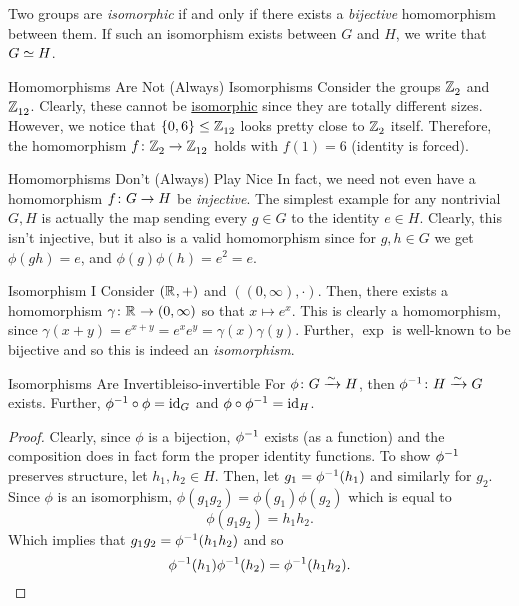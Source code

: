 \documentclass{article}
\begin{document}
Two groups are \emph{isomorphic} if and only if there
exists a \emph{bijective} homomorphism between them.
If such an isomorphism exists between $G$ and $H$, we write that $G \iso H$.

\begin{example}{Homomorphisms Are Not (Always) Isomorphisms}{}
  Consider the groups $\ZZ_{2}$ and $\ZZ_{12}$.
  Clearly, these cannot be \underline{isomorphic} since they are totally different sizes.
  However, we notice that $\set{0, 6} \le \ZZ_{12}$ looks pretty close to $\ZZ_{2}$ itself.
  Therefore, the homomorphism $f \from \ZZ_{2} \to \ZZ_{12}$ holds with $f(1) = 6$
  (identity is forced).
\end{example}

\begin{example}{Homomorphisms Don't (Always) Play Nice}{}
  In fact, we need not even have a homomorphism $f \from G \to H$ be \emph{injective}.
  The simplest example for any nontrivial $G, H$ is actually the map sending every $g \in G$
  to the identity $e \in H$. Clearly, this isn't injective, but it also is a valid homomorphism
  since for $g, h \in G$ we get $\phi(gh) = e$, and $\phi(g)\phi(h) = e^{2} = e$.
\end{example}


\begin{example}{Isomorphism I}{}
  Consider $(\RR, +)$ and $((0, \infty), \cdot)$.
  Then, there exists a homomorphism $\gamma \from \RR \to (0, \infty)$ so that $x \mapsto e^{x}$.
  This is clearly a homomorphism, since $\gamma(x + y) = e^{x + y} = e^{x}e^{y} = \gamma(x)\gamma(y)$.
  Further, $\exp$ is well-known to be bijective and so this is indeed an \emph{isomorphism}.
\end{example}

\begin{theorem}{Isomorphisms Are Invertible}{iso-invertible}
  For $\phi \from G \isoto H$, then $\phi\inv \from H \isoto G$ exists.
  Further, $\phi\inv \circ \phi = \id[G]$ and $\phi \circ \phi\inv = \id[H]$.
\end{theorem}

\begin{proof}
  Clearly, since $\phi$ is a bijection, $\phi\inv$ exists (as a function) and the composition
  does in fact form the proper identity functions.
  To show $\phi\inv$ preserves structure, let $h_{1},h_{2} \in H$.
  Then, let $g_{1} = \phi\inv(h_{1})$ and similarly for $g_{2}$.
  Since $\phi$ is an isomorphism, $\phi(g_{1}g_{2}) = \phi(g_{1})\phi(g_{2})$ which is equal to
  \[ \phi(g_{1}g_{2}) = h_{1}h_{2}. \]
  Which implies that $g_{1}g_{2} = \phi\inv(h_{1}h_{2})$ and so
  \[ \phi\inv(h_{1})\phi\inv(h_{2}) = \phi\inv(h_{1}h_{2}). \qedhere \]
\end{proof}
\end{document}
